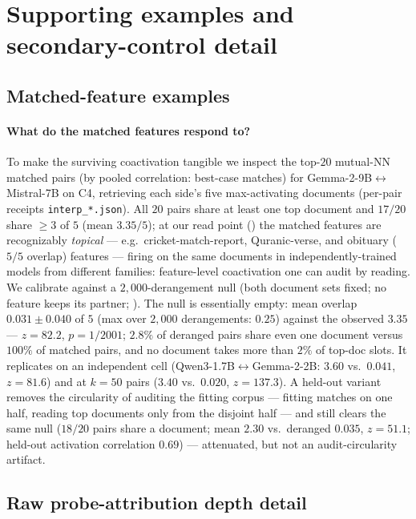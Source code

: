 \section{Supporting examples and secondary-control detail}

\subsection{Matched-feature examples}\label{app:matched-examples}
\paragraph{What do the matched features respond to?} To make the surviving coactivation tangible we
inspect the top-$20$ mutual-NN matched pairs (by pooled correlation: best-case matches)
for Gemma-2-9B$\leftrightarrow$Mistral-7B on C4, retrieving each side's five
max-activating documents (per-pair receipts \texttt{interp\_*.json}). All $20$ pairs
share at least one top document and $17/20$ share $\geq3$ of $5$
(mean $3.35/5$); at our read point () the matched features are recognizably \emph{topical} --- e.g.\
cricket-match-report, Quranic-verse, and obituary ($5/5$ overlap) features --- firing on
the same documents in independently-trained models from
different families: feature-level coactivation one can audit by reading. We calibrate against a
$2{,}000$-derangement null (both document sets fixed; no feature keeps its partner;
\Cref{tab:interp_null}). The null is essentially empty: mean
overlap $0.031\pm0.040$ of $5$ (max over $2{,}000$ derangements: $0.25$) against the
observed $3.35$ --- $z=82.2$, $p=1/2001$; $2.8\%$ of deranged pairs share even
one document versus $100\%$ of matched pairs, and no document takes more than $2\%$
of top-doc slots. It replicates on an independent cell
(Qwen3-1.7B$\leftrightarrow$Gemma-2-2B: $3.60$ vs.\ $0.041$, $z=81.6$) and at $k{=}50$
pairs ($3.40$ vs.\ $0.020$, $z=137.3$). A held-out variant removes the circularity of
auditing the fitting corpus --- fitting matches on one half, reading top documents only
from the disjoint half --- and still clears the same null ($18/20$ pairs share a document;
mean $2.30$ vs.\ deranged $0.035$, $z=51.1$; held-out activation correlation $0.69$) ---
attenuated, but not an audit-circularity artifact.



\subsection{Raw probe-attribution depth detail}\label{app:raw-depth-detail}
